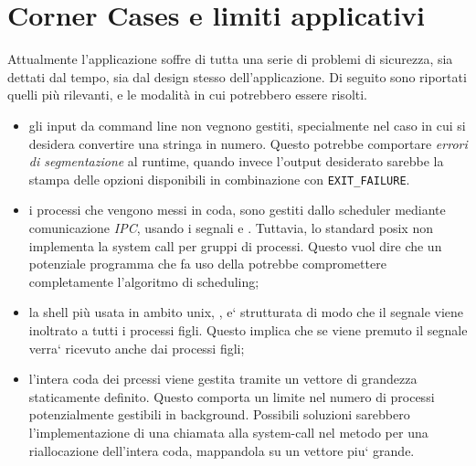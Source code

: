 \documentclass[11pt]{article}
\begin{document}
\\
\\
\\
\\
\\
\\
\\
\\
\\
\\
\\
\\

\section{Corner Cases e limiti applicativi}

Attualmente l'applicazione soffre di tutta una serie di problemi di sicurezza,
sia dettati dal tempo, sia dal design stesso dell'applicazione. Di seguito sono
riportati quelli pi\`u rilevanti, e le modalit\`a in cui potrebbero essere
risolti.

\begin{itemize}
\item gli input da command line non vegnono gestiti, specialmente nel caso in cui si desidera convertire una stringa in numero.
      Questo potrebbe comportare \emph{errori di segmentazione} al runtime, quando invece l'output desiderato sarebbe la stampa
      delle opzioni disponibili  in combinazione con \texttt{EXIT\_FAILURE}.

\item i processi che vengono messi in coda, sono gestiti dallo scheduler mediante
      comunicazione \emph{IPC}, usando i segnali
       e . Tuttavia, lo standard posix non
      implementa la system call  per gruppi di processi. Questo vuol
      dire che un potenziale programma che fa uso della  potrebbe
      compromettere completamente l'algoritmo di scheduling;

\item la shell pi\`u usata in ambito unix, , e` strutturata di modo
      che il segnale  viene inoltrato a tutti i processi figli.
      Questo implica che se viene premuto  il segnale verra` ricevuto
      anche dai processi figli;

\item l'intera coda dei prcessi viene gestita tramite un vettore di grandezza 
      staticamente definito. Questo comporta un limite nel numero di processi potenzialmente
      gestibili in background. Possibili soluzioni sarebbero l'implementazione di una chiamata alla
      system-call  nel metodo  per una riallocazione
      dell'intera coda, mappandola su un vettore piu` grande.
\end{itemize}
\end{document}
